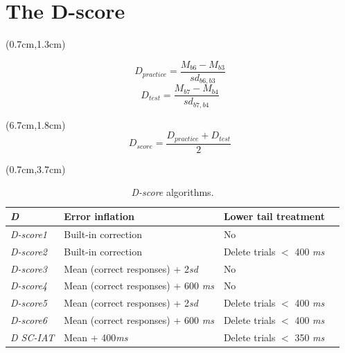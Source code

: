 \documentclass[10pt]{beamer}
\begin{document}
\section{The D-score}
\begin{frame}

\begin{textblock*}{3.5cm}(0.7cm,1.3cm)

\begin{equation*}
D_{practice} = \frac{M_{b6} - M_{b3}}{sd_{b6,b3}}
\end{equation*}
\begin{equation*}
D_{test} = \frac{M_{b7} - M_{b4}}{sd_{b7,b4}}
\end{equation*}
\end{textblock*}

\begin{textblock*}{3.5cm}(6.7cm,1.8cm)
\begin{equation*}
D_{score} = \frac{D_{practice} + D_{test}}{2}
\end{equation*}
\end{textblock*}

\begin{textblock*}{\linewidth}(0.7cm,3.7cm)
\small
\begin{table}[th!]
\centering
\caption{\emph{D-score} algorithms.}
\begin{tabularx}{\linewidth}{llll}
\hline
\emph{D} & Error inflation & Lower tail treatment\\\hline
\emph{D-score1} & Built-in correction & No \\
\emph{D-score2} & Built-in correction & Delete trials $<$ 400 \emph{ms} \\
\emph{D-score3} & Mean (correct responses) + 2\emph{sd} & No\\
\emph{D-score4} & Mean (correct responses) + 600 \emph{ms} & No \\
\emph{D-score5} & Mean (correct responses) + 2\emph{sd} & Delete trials $<$ 400 \emph{ms}\\
\emph{D-score6} & Mean (correct responses) + 600 \emph{ms} & Delete trials $<$ 400 \emph{ms} \\
\emph{D SC-IAT} & Mean + 400\emph{ms} & Delete trials $<$ 350 \emph{ms} \\\hline
\end{tabularx}
\end{table}
\end{textblock*}
\end{frame}
\end{document}
